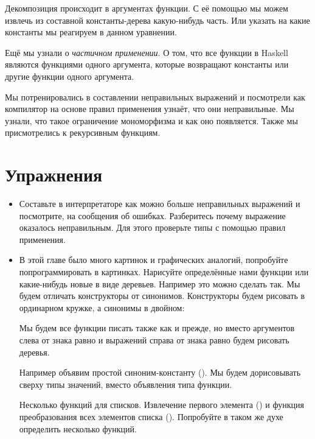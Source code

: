 Декомпозиция происходит в аргументах функции. 
С её помощью мы можем извлечь из составной константы-дерева
какую-нибудь часть. Или указать на какие константы мы реагируем 
в данном уравнении. 

Ещё мы узнали о \emph{частичном применении}. О том, что все
функции в Haskell являются функциями одного аргумента,
которые возвращают константы или другие функции одного аргумента. 

Мы потренировались в составлении неправильных выражений
и посмотрели как компилятор на основе правил применения 
узнаёт, что они неправильные. Мы узнали, что такое
ограничение мономорфизма и как оно появляется.
Также мы присмотрелись к рекурсивным функциям. 


\section{Упражнения}

\begin{itemize}

\item Составьте в интерпретаторе как можно больше
    неправильных выражений и посмотрите, на сообщения об ошибках.
    Разберитесь почему выражение оказалось неправильным.
    Для этого проверьте типы с помощью правил применения.

\item В этой главе было много картинок и графических аналогий, 
попробуйте попрограммировать в картинках. Нарисуйте 
определённые нами функции или какие-нибудь новые в
виде деревьев. Например это можно сделать так.
Мы будем отличать конструкторы от синонимов. Конструкторы
будем рисовать в ординарном кружке, а синонимы в двойном:


Мы будем все функции писать также как и прежде, но 
вместо аргументов слева от знака равно и выражений
справа от знака равно будем рисовать деревья. 

Например объявим простой синоним-константу ().
Мы будем дорисовывать сверху типы значений, вместо объявления типа
функции.


Несколько функций для списков. Извлечение первого элемента 
() и функция преобразования всех элементов списка 
().
Попробуйте в таком же духе определить несколько функций.

\end{itemize}




